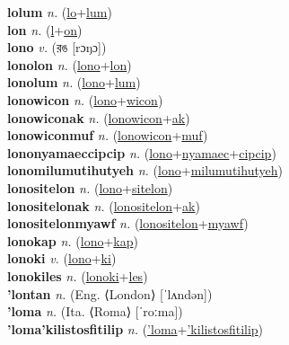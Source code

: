 \textbf{lolum} \textit{n.} (\hyperref[lo]{lo}+\hyperref[lum]{lum})
 \label{lolum} \\
\textbf{lon} \textit{n.} (\hyperref[l]{l}+\hyperref[on]{on})
 \label{lon} \\
\textbf{lono} \textit{v.} ({\bengali{}রঙ} [rɔŋɔ])
 \label{lono} \\
\textbf{lonolon} \textit{n.} (\hyperref[lono]{lono}+\hyperref[lon]{lon})
 \label{lonolon} \\
\textbf{lonolum} \textit{n.} (\hyperref[lono]{lono}+\hyperref[lum]{lum})
 \label{lonolum} \\
\textbf{lonowicon} \textit{n.} (\hyperref[lono]{lono}+\hyperref[wicon]{wicon})
 \label{lonowicon} \\
\textbf{lonowiconak} \textit{n.} (\hyperref[lonowicon]{lonowicon}+\hyperref[ak]{ak})
 \label{lonowiconak} \\
\textbf{lonowiconmuf} \textit{n.} (\hyperref[lonowicon]{lonowicon}+\hyperref[muf]{muf})
 \label{lonowiconmuf} \\
\textbf{lononyamaeccipcip} \textit{n.} (\hyperref[lono]{lono}+\hyperref[nyamaec]{nyamaec}+\hyperref[cipcip]{cipcip})
 \label{lononyamaeccipcip} \\
\textbf{lonomilumutihutyeh} \textit{n.} (\hyperref[lono]{lono}+\hyperref[milumutihutyeh]{milumutihutyeh})
 \label{lonomilumutihutyeh} \\
\textbf{lonositelon} \textit{n.} (\hyperref[lono]{lono}+\hyperref[sitelon]{sitelon})
 \label{lonositelon} \\
\textbf{lonositelonak} \textit{n.} (\hyperref[lonositelon]{lonositelon}+\hyperref[ak]{ak})
 \label{lonositelonak} \\
\textbf{lonositelonmyawf} \textit{n.} (\hyperref[lonositelon]{lonositelon}+\hyperref[myawf]{myawf})
 \label{lonositelonmyawf} \\
\textbf{lonokap} \textit{n.} (\hyperref[lono]{lono}+\hyperref[kap]{kap})
 \label{lonokap} \\
\textbf{lonoki} \textit{v.} (\hyperref[lono]{lono}+\hyperref[ki]{ki})
 \label{lonoki} \\
\textbf{lonokiles} \textit{n.} (\hyperref[lonoki]{lonoki}+\hyperref[les]{les})
 \label{lonokiles} \\
\textbf{'lontan} \textit{n.} (Eng. ⟨London⟩ [ˈlʌndən])
 \label{'lontan} \\
\textbf{'loma} \textit{n.} (Ita. ⟨Roma⟩ [ˈroːma])
 \label{'loma} \\
\textbf{'loma'kilistosfitilip} \textit{n.} (\hyperref['loma]{'loma}+\hyperref['kilistosfitilip]{'kilistosfitilip})
